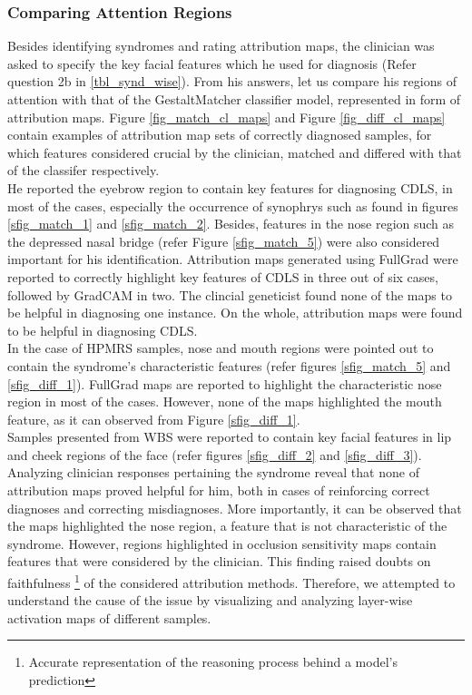 \documentclass[../report.tex]{subfiles}
\begin{document}
	\subsubsection{Comparing Attention Regions}
	Besides identifying syndromes and rating attribution maps, the clinician was asked to specify the key facial features which he used for diagnosis (Refer question 2b in \ref{tbl_synd_wise}). From his answers, let us compare his regions of attention with that of the GestaltMatcher classifier model, represented in form of attribution maps.  Figure \ref{fig_match_cl_maps} and Figure \ref{fig_diff_cl_maps}  contain examples of attribution map sets of correctly diagnosed samples, for which features considered crucial by the clinician, matched and differed with that of the classifer respectively.\\
	He reported the eyebrow region to contain key features for diagnosing CDLS, in most of the cases, especially the occurrence of synophrys such as found in figures \ref{sfig_match_1} and \ref{sfig_match_2}. Besides, features in the nose region such as the depressed nasal bridge (refer Figure \ref{sfig_match_5}) were also considered important for his identification. Attribution maps generated using FullGrad were reported to correctly highlight key features of CDLS in three out of six cases, followed by GradCAM in two. The clincial geneticist found none of the maps to be helpful in diagnosing one instance. On the whole, attribution maps were found to be helpful in diagnosing CDLS.\\
	In the case of HPMRS samples, nose and mouth regions were pointed out to contain the syndrome's characteristic features (refer figures \ref{sfig_match_5} and \ref{sfig_diff_1}). FullGrad maps are reported to highlight the characteristic nose region in most of the cases. However, none of the maps highlighted the mouth feature, as it can observed from  Figure \ref{sfig_diff_1}.\\
    Samples presented from WBS were reported to contain key facial features in lip and cheek regions of the face (refer figures \ref{sfig_diff_2} and \ref{sfig_diff_3}). Analyzing clinician responses pertaining the syndrome reveal that none of attribution maps proved helpful for him, both in cases of reinforcing correct diagnoses and correcting misdiagnoses. More importantly, it can be observed that the maps highlighted the nose region, a feature that is not characteristic of the syndrome. However, regions highlighted in occlusion sensitivity maps contain features that were considered by the clinician. This finding raised doubts on faithfulness \footnote[1]{Accurate representation of the reasoning process behind a model's prediction} of the considered attribution methods. Therefore, we attempted to understand the cause of the issue by visualizing and analyzing layer-wise activation maps of different samples.
    
\end{document}
